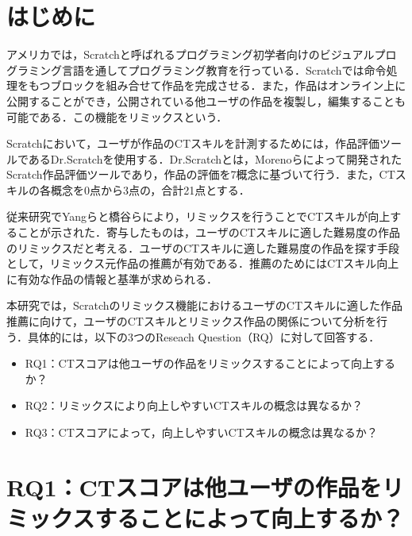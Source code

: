 \documentclass[twocolumn]{jarticle} %
\begin{document}
\maketitle
\thispagestyle{empty} %



\section{はじめに}
アメリカでは，Scratch\cite{resnick2009scratch}と呼ばれるプログラミング初学者向けのビジュアルプログラミング言語を通してプログラミング教育を行っている．Scratchでは命令処理をもつブロックを組み合せて作品を完成させる．また，作品はオンライン上に公開することができ，公開されている他ユーザの作品を複製し，編集することも可能である．この機能をリミックスという．

Scratchにおいて，ユーザが作品のCTスキルを計測するためには，作品評価ツールであるDr.Scratch\cite{moreno2015dr}を使用する．Dr.Scratchとは，Morenoらによって開発されたScratch作品評価ツールであり，作品の評価を7概念に基づいて行う．また，CTスキルの各概念を0点から3点の，合計21点とする．

従来研究でYangら\cite{10.1145/2724660.2724674}と橋谷ら\cite{橋谷直樹2022scratch}により，リミックスを行うことでCTスキルが向上することが示された．寄与したものは，ユーザのCTスキルに適した難易度の作品のリミックスだと考える．ユーザのCTスキルに適した難易度の作品を探す手段として，リミックス元作品の推薦が有効である．推薦のためにはCTスキル向上に有効な作品の情報と基準が求められる．

本研究では，Scratchのリミックス機能におけるユーザのCTスキルに適した作品推薦に向けて，ユーザのCTスキルとリミックス作品の関係について分析を行う．具体的には，以下の3つのReseach Question（RQ）に対して回答する．
\begin{itemize}
  \item{RQ1：CTスコアは他ユーザの作品をリミックスすることによって向上するか？}
  \item{RQ2：リミックスにより向上しやすいCTスキルの概念は異なるか？}
  \item{RQ3：CTスコアによって，向上しやすいCTスキルの概念は異なるか？}
\end{itemize}

\section{RQ1：CTスコアは他ユーザの作品をリミックスすることによって向上するか？}
\end{document}
